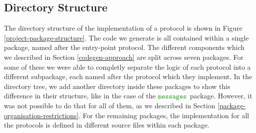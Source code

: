 \documentclass[12pt,twoside]{report}
\begin{document}

\subsection{Directory Structure}\label{directory-structure}

    

The directory structure of the implementation of a protocol is shown in Figure \ref{project-package-structure}. The code we generate is all contained within a single package, named after the entry-point protocol. The different components which we described in Section \ref{codegen-approach} are split across seven packages. For some of these we were able to completly separate the logic of each protocol into a different subpackage, each named after the protocol which they implement. In the directory tree, we add another directory inside these packages to show this difference in their structure, like in the case of the $\pkgname{messages}$ package. However, it was not possible to do that for all of them, as we described in Section \ref{package-organisation-restrictions}. For the remaining packages, the implementation for all the protocols is defined in different source files within each package.\\
\end{document}
